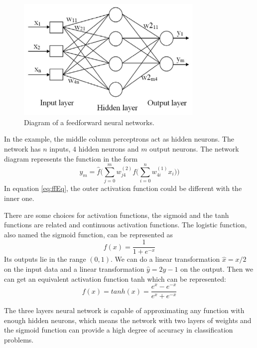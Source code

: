 \begin{figure}[!htb]
\centering
\includegraphics[width=0.8\textwidth]{Figure2-2.png}
\caption{\label{fig:ffnet}Diagram of a feedforward neural networks.}
\end{figure}

In the example, the middle column perceptrons act as hidden neurons. The network has $n$ inputs, $4$ hidden neurons and $m$ output neurons. The network diagram represents the function in the form
\begin{equation}\label{eq:ffEq}
y_{m} = \hat{f}\Big(\sum_{j=0}^{m}w_{j4}^{(2)}f\big(\sum_{i=0}^{n}w_{4i}^{(1)}x_{i}\big)\Big)
\end{equation}
In equation \ref{eq:ffEq}, the outer activation function could be different with the inner one.

There are some choices for activation functions, the sigmoid and the tanh functions are related and continuous activation functions. The logistic function, also named the sigmoid function, can be represented as 
\begin{equation}\label{eq:sigmoid}
f(x) = \frac{1}{1+e^{-x}}
\end{equation}
Its outputs lie in the range $(0,1)$. We can do a linear transformation $\hat{x}=x/2$ on the input data and a linear transformation $\hat{y}=2y-1$ on the output. Then we can get an equivalent activation function tanh which can be represented:
\begin{equation}\label{eq:tanh}
f(x) = tanh(x) = \frac{e^{x}-e^{-x}}{e^{x}+e^{-x}}
\end{equation}

The three layers neural network is capable of approximating any function with enough hidden neurons, which means the network with two layers of weights and the sigmoid function can provide a high degree of accuracy in classification problems. 

